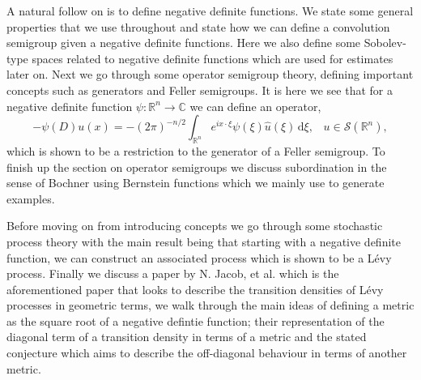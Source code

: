 \documentclass[a4paper, 12pt]{report}
\theoremstyle{remark}
\theoremstyle{definition}
\begin{document}
A natural follow on is to define negative definite functions.  We state some general properties that we use throughout and state how we can define a convolution semigroup given a negative definite functions.  Here we also define some Sobolev-type spaces related to negative definite functions which are used for estimates later on.  Next we go through some operator semigroup theory, defining important concepts such as generators and Feller semigroups.  It is here we see that for a negative definite function $\psi : \mathbb{R}^n \to \mathbb{C}$ we can define an operator,
$$
-\psi(D)u(x) = -(2\pi)^{-n/2}\int_{\mathbb{R}^n}e^{ix\cdot\xi}\psi(\xi)\hat{u}(\xi)\,\mathrm{d}\xi, \,\,\,\,\, u \in \mathcal{S}(\mathbb{R}^n),
$$
which is shown to be a restriction to the generator of a Feller semigroup.  To finish up the section on operator semigroups we discuss subordination in the sense of Bochner using Bernstein functions which we mainly use to generate examples.

Before moving on from introducing concepts we go through some stochastic process theory with the main result being that starting with a negative definite function, we can construct an associated process which is shown to be a L\'evy process.  Finally we discuss a paper by N. Jacob, et al. \cite{Paper} which is the aforementioned paper that looks to describe the transition densities of L\'evy processes in geometric terms, we walk through the main ideas of defining a metric as the square root of a negative defintie function; their representation of the diagonal term of a transition density in terms of a metric and the stated conjecture which aims to describe the off-diagonal behaviour in terms of another metric.
\end{document}
